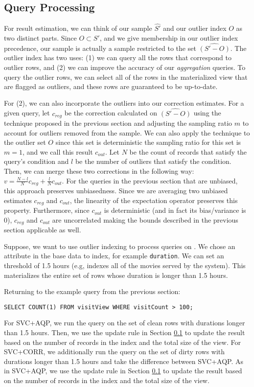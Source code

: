 \subsection{Query Processing}\label{oqp} 
For result estimation, we can think of our sample $\hat{S'}$ and our outlier index $O$ as two distinct parts.
Since $O \subset S'$, and we give membership in our outlier index precedence, our sample is actually a sample restricted to the set $\widehat{(S'-O)}$. 
The outlier index has two uses: (1) we can query all the rows that correspond to outlier rows, 
and (2) we can improve the accuracy of our \emph{aggregation} queries.
To query the outlier rows, we can select all of the rows in the materialized view that are flagged as outliers, and these rows are guaranteed to be up-to-date.

For (2), we can also incorporate the outliers into our correction estimates.  
For a given query, let $c_{reg}$ be the correction calculated on $\widehat{(S'-O)}$ using the technique proposed in the previous section and adjusting the sampling ratio $m$ to account for outliers removed from the sample.
We can also apply the technique to the outlier set $O$ since this set is deterministic the sampling ratio for this set is $m=1$, and we call this result $c_{out}$.
Let $N$ be the count of records that satisfy the query's condition and $l$ be the number of outliers that satisfy the condition.
Then, we can merge these two corrections in the following way:
$
 v = \frac{N-l}{N}c_{reg} + \frac{l}{N}c_{out}
$.
For the queries in the previous section that are unbiased, this approach preserves unbiasedness.
Since we are averaging two unbiased estimates $c_{reg}$ and $c_{out}$, the linearity of the expectation operator preserves this property.
Furthermore, since $c_{out}$ is deterministic (and in fact its bias/variance is 0), $c_{reg}$ and $c_{out}$ are uncorrelated making the bounds described in the previous section applicable as well.

\begin{example}
Suppose, we want to use outlier indexing to process queries on .
We chose an attribute in the base data to index, for example \texttt{duration}.
We can set an threshold of 1.5 hours (e.g, indexes all of the movies served by the system).
This materializes the entire set of rows whose duration is longer than 1.5 hours.

Returning to the example query from the previous section:
\begin{lstlisting}[basicstyle={\scriptsize}]
SELECT COUNT(1) FROM visitView WHERE visitCount > 100;
\end{lstlisting}
For SVC+AQP, we run the query on the set of clean rows with durations longer than 1.5 hours.
Then, we use the update rule in Section \ref{oqp} to update the result based on the number of records in the index and the total size of the view.
For SVC+CORR, we additionally run the query on the set of dirty rows with durations longer than 1.5 hours and take the difference between SVC+AQP.
As in SVC+AQP, we use the update rule in Section \ref{oqp} to update the result based on the number of records in the index and the total size of the view.
\end{example}


